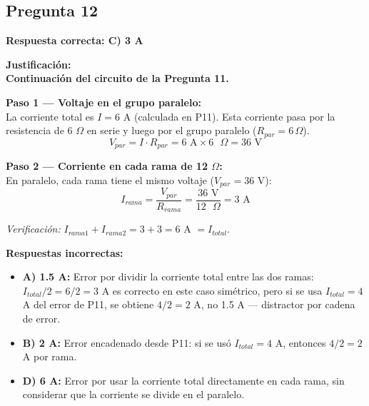 \begin{respuestabox}
\subsection{Pregunta 12}
\textcolor{verdecorrecto}{\textbf{Respuesta correcta: C) 3 A}}

\textbf{Justificación:}\\
\textbf{Continuación del circuito de la Pregunta 11.}

\textbf{Paso 1 — Voltaje en el grupo paralelo:}\\
La corriente total es $I = 6$ A (calculada en P11). Esta corriente pasa por la resistencia de 6 $\Omega$ en serie y luego por el grupo paralelo ($R_{par} = 6\,\Omega$).
$$V_{par} = I \cdot R_{par} = 6 \text{ A} \times 6 \text{ }\Omega = 36 \text{ V}$$

\textbf{Paso 2 — Corriente en cada rama de 12 $\Omega$:}\\
En paralelo, cada rama tiene el mismo voltaje ($V_{par} = 36$ V):
$$I_{rama} = \frac{V_{par}}{R_{rama}} = \frac{36 \text{ V}}{12 \text{ }\Omega} = 3 \text{ A}$$

\textit{Verificación:} $I_{rama1} + I_{rama2} = 3 + 3 = 6$ A $= I_{total}$. \checkmark

\textbf{Respuestas incorrectas:}
\begin{itemize}
    \item \textbf{A) 1.5 A:} Error por dividir la corriente total entre las dos ramas: $I_{total}/2 = 6/2 = 3$ A es correcto en este caso simétrico, pero si se usa $I_{total} = 4$ A del error de P11, se obtiene $4/2 = 2$ A, no 1.5 A — distractor por cadena de error.
    \item \textbf{B) 2 A:} Error encadenado desde P11: si se usó $I_{total} = 4$ A, entonces $4/2 = 2$ A por rama.
    \item \textbf{D) 6 A:} Error por usar la corriente total directamente en cada rama, sin considerar que la corriente se divide en el paralelo.
\end{itemize}
\end{respuestabox}

